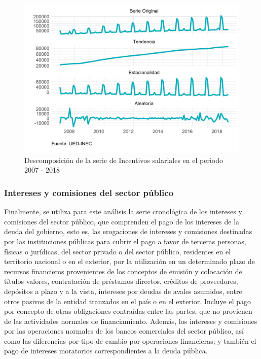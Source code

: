 \documentclass[
]{article}
\begin{document}
\begin{figure}[H]
\includegraphics[width=1\linewidth,height=1\textheight]{Tesis_files/figure-latex/incentivosplotdescomposicion-1} \caption{Descomposición de la serie de Incentivos salariales en el periodo 2007 - 2018}\label{fig:incentivosplotdescomposicion}
\end{figure}

\subsubsection{Intereses y comisiones del sector público}

Finalmente, se utiliza para este análisis la serie cronológica de los
intereses y comisiones del sector público, que comprenden el pago de los
intereses de la deuda del gobierno, esto es, las erogaciones de
intereses y comisiones destinadas por las instituciones públicas para
cubrir el pago a favor de terceras personas, físicas o jurídicas, del
sector privado o del sector público, residentes en el territorio
nacional o en el exterior, por la utilización en un determinado plazo de
recursos financieros provenientes de los conceptos de emisión y
colocación de títulos valores, contratación de préstamos directos,
créditos de proveedores, depósitos a plazo y a la vista, intereses por
deudas de avales asumidos, entre otros pasivos de la entidad tranzados
en el país o en el exterior. Incluye el pago por concepto de otras
obligaciones contraídas entre las partes, que no provienen de las
actividades normales de financiamiento. Además, los intereses y
comisiones por las operaciones normales de los bancos comerciales del
sector público, así como las diferencias por tipo de cambio por
operaciones financieras; y también el pago de intereses moratorios
correspondientes a la deuda pública.
\end{document}
